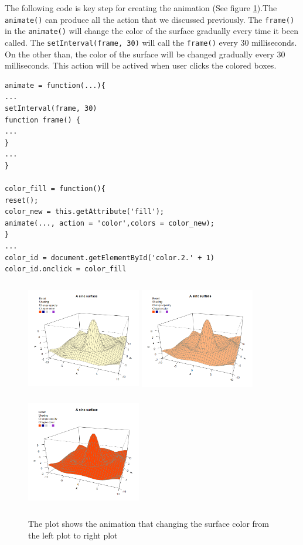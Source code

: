 \documentclass[paper=a4, fontsize=11pt]{report}
\begin{document}
The following code is key step for creating the animation (See figure \ref{Example_6.3.1}).The \texttt{animate()} can produce all the action that we discussed previously. The \texttt{frame()} in the \texttt{animate()} will change the color of the surface gradually every time it been called. The \texttt{setInterval(frame, 30)} will call the \texttt{frame()} every 30 milliseconds. On the other than, the color of the surface will be changed gradually every 30 milliseconds. This action will be actived when user clicks the colored boxes.

\begin{lstlisting}
animate = function(...){
...
setInterval(frame, 30)
function frame() {
...
}
...
}

color_fill = function(){
reset();
color_new = this.getAttribute('fill');
animate(..., action = 'color',colors = color_new);
}
...
color_id = document.getElementById('color.2.' + 1)
color_id.onclick = color_fill
\end{lstlisting}


\begin{figure}[h]
	\begin{center}
		\includegraphics[height = 5cm, width = 5cm]{figure/svg/origin_1.PNG}
		\includegraphics[height = 5cm, width = 5cm]{figure/svg/change_2.PNG}
		\includegraphics[height = 5cm, width = 5cm]{figure/svg/change_3.PNG}
		\caption{The plot shows the animation that changing the surface color from the left plot to right plot}
		\label{Example_6.3.1}
	\end{center}
\end{figure}
\end{document}
